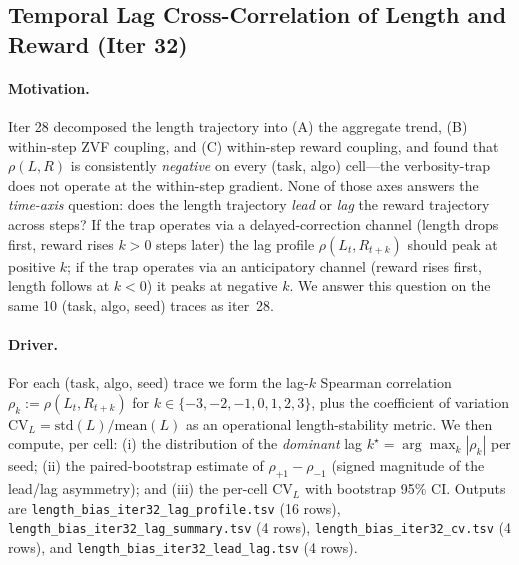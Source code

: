 \subsection{Temporal Lag Cross-Correlation of Length and Reward (Iter 32)}
\label{sec:length-bias-iter32}

\paragraph{Motivation.}
Iter 28 decomposed the length trajectory into (A) the aggregate trend,
(B) within-step ZVF coupling, and (C) within-step reward coupling, and
found that $\rho(L,R)$ is consistently \emph{negative} on every (task,
algo) cell---the verbosity-trap does not operate at the within-step
gradient. None of those axes answers the \emph{time-axis} question: does
the length trajectory \emph{lead} or \emph{lag} the reward trajectory
across steps? If the trap operates via a delayed-correction channel
(length drops first, reward rises $k{>}0$ steps later) the lag profile
$\rho(L_t, R_{t{+}k})$ should peak at positive $k$; if the trap operates
via an anticipatory channel (reward rises first, length follows at
$k{<}0$) it peaks at negative $k$. We answer this question on the same
10 (task, algo, seed) traces as iter~28.

\paragraph{Driver.}
For each (task, algo, seed) trace we form the lag-$k$ Spearman
correlation
$\rho_k := \rho(L_t, R_{t{+}k})$ for $k \in \{-3,-2,-1,0,1,2,3\}$,
plus the coefficient of variation $\mathrm{CV}_L = \mathrm{std}(L)/\mathrm{mean}(L)$
as an operational length-stability metric. We then compute, per cell:
(i) the distribution of the \emph{dominant} lag $k^\star =
\arg\max_{k}|\rho_k|$ per seed; (ii) the paired-bootstrap estimate of
$\rho_{+1} - \rho_{-1}$ (signed magnitude of the lead/lag asymmetry); and
(iii) the per-cell $\mathrm{CV}_L$ with bootstrap 95\% CI. Outputs are
\texttt{length\_bias\_iter32\_lag\_profile.tsv} (16 rows),
\texttt{length\_bias\_iter32\_lag\_summary.tsv} (4 rows),
\texttt{length\_bias\_iter32\_cv.tsv} (4 rows), and
\texttt{length\_bias\_iter32\_lead\_lag.tsv} (4 rows).

